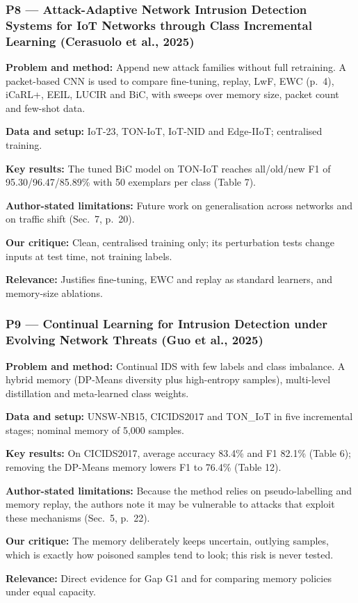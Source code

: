 \documentclass[10pt,a4paper]{article}
\newcommand{\sumitem}[2]{\noindent\textbf{#1:} #2\par}
\begin{document}
\subsubsection*{P8 --- Attack-Adaptive Network Intrusion Detection Systems for IoT Networks through Class Incremental Learning (Cerasuolo et al., 2025)}
\sumitem{Problem and method}{Append new attack families without full retraining. A packet-based CNN is used to compare fine-tuning, replay, LwF, EWC (p.~4), iCaRL+, EEIL, LUCIR and BiC, with sweeps over memory size, packet count and few-shot data.}
\sumitem{Data and setup}{IoT-23, TON-IoT, IoT-NID and Edge-IIoT; centralised training.}
\sumitem{Key results}{The tuned BiC model on TON-IoT reaches all/old/new F1 of 95.30/96.47/85.89\% with 50 exemplars per class (Table 7).}
\sumitem{Author-stated limitations}{Future work on generalisation across networks and on traffic shift (Sec.~7, p.~20).}
\sumitem{Our critique}{Clean, centralised training only; its perturbation tests change inputs at test time, not training labels.}
\sumitem{Relevance}{Justifies fine-tuning, EWC and replay as standard learners, and memory-size ablations.}

\subsubsection*{P9 --- Continual Learning for Intrusion Detection under Evolving Network Threats (Guo et al., 2025)}
\sumitem{Problem and method}{Continual IDS with few labels and class imbalance. A hybrid memory (DP-Means diversity plus high-entropy samples), multi-level distillation and meta-learned class weights.}
\sumitem{Data and setup}{UNSW-NB15, CICIDS2017 and TON\_IoT in five incremental stages; nominal memory of 5,000 samples.}
\sumitem{Key results}{On CICIDS2017, average accuracy 83.4\% and F1 82.1\% (Table 6); removing the DP-Means memory lowers F1 to 76.4\% (Table 12).}
\sumitem{Author-stated limitations}{Because the method relies on pseudo-labelling and memory replay, the authors note it may be vulnerable to attacks that exploit these mechanisms (Sec.~5, p.~22).}
\sumitem{Our critique}{The memory deliberately keeps uncertain, outlying samples, which is exactly how poisoned samples tend to look; this risk is never tested.}
\sumitem{Relevance}{Direct evidence for Gap G1 and for comparing memory policies under equal capacity.}
\end{document}
